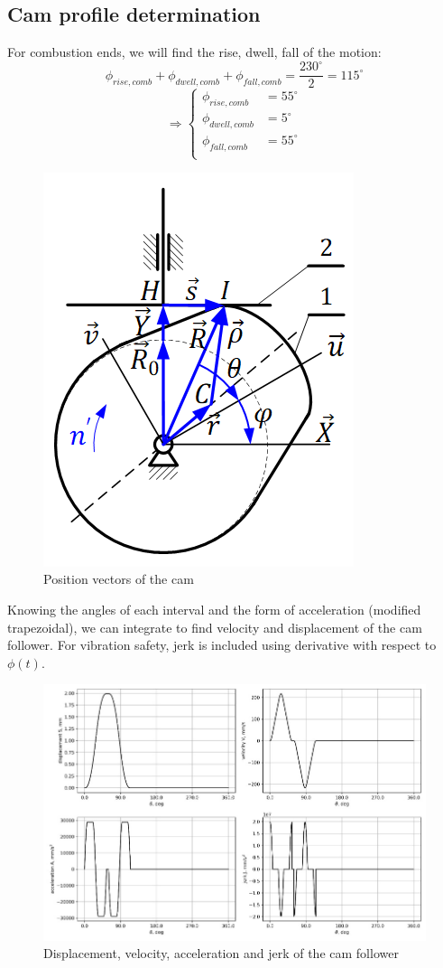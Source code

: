 \subsection{Cam profile determination}
For combustion ends, we will find the rise, dwell, fall of the motion:
\[\phi_{rise,comb}+\phi_{dwell,comb}+\phi_{fall,comb}=\dfrac{230^\circ}{2}=115^\circ\]
\[\Rightarrow\left\{\begin{array}{ll}
\phi_{rise,comb}&=55^\circ\\
\phi_{dwell,comb}&=5^\circ\\
\phi_{fall,comb}&=55^\circ\\
\end{array}\right.\]
\begin{figure}[h]
	\centering
	\includegraphics[width=0.4\linewidth]{26}
	\caption{Position vectors of the cam}
	\label{fig:26}
\end{figure}
Knowing the angles of each interval and the form of acceleration (modified trapezoidal), we can integrate to find velocity and displacement of the cam follower. For vibration safety, jerk is included using derivative with respect to $ \phi(t) $.
\begin{figure}[h]
	\centering
	\includegraphics[width=0.8\linewidth]{24}
	\caption{Displacement, velocity, acceleration and jerk of the cam follower}
	\label{fig:24}
\end{figure}

